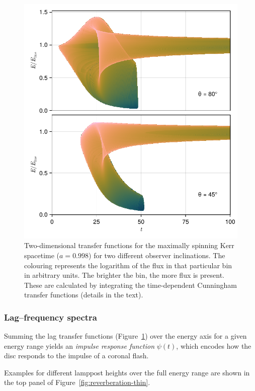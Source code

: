 \documentclass[fleqn,usenatbib]{mnras}
\begin{document}
\begin{figure}
    \centering
    \includegraphics[width=0.97\columnwidth]{figures/transfer-functions.2d.pdf}
    \caption{Two-dimensional transfer functions for the maximally spinning Kerr
        spacetime ($a = 0.998$) for two different observer inclinations. The
        colouring represents the logarithm of the flux in that particular bin in
        arbitrary units. The brighter the bin, the more flux is present. These
        are calculated by integrating the time-dependent Cunningham transfer
        functions
    (details in the text).}
    \label{fig:lag-frequency-transfer-functions}
\end{figure}

\subsubsection{Lag--frequency spectra}

Summing the lag transfer functions
(Figure~\ref{fig:lag-frequency-transfer-functions}) over the energy axis for a
given energy range yields an \textit{impulse response function} $\psi(t)$, which
encodes how the disc responds to the impulse of a coronal flash.

Examples for different lamppost heights over the full energy range are shown in
the top panel of Figure~\ref{fig:reverberation-thin}.
\end{document}
